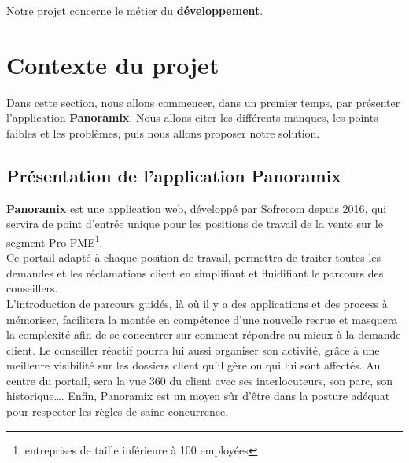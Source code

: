 Notre projet concerne le métier du \textbf{développement}.
\section[Contexte du projet]{Contexte du projet}
Dans cette section, nous allons commencer, dans un premier temps, par présenter l’application \textbf{Panoramix}. Nous allons citer les différents manques, les points faibles et les problèmes, puis nous allons proposer notre solution.
\subsection[Présentation de l’application Panoramix]{Présentation de l’application Panoramix \cite{panoramix}}
\textbf{Panoramix} est une application web, développé par Sofrecom depuis 2016, qui servira de point d'entrée unique pour les positions de travail de la vente sur le segment Pro PME\footnote{entreprises de taille inférieure à 100 employées}.\\
Ce portail adapté à chaque position de travail, permettra de traiter toutes les demandes et les réclamations client en simplifiant et fluidifiant le parcours des conseillers.\\
L’introduction de parcours guidés, là où il y a des applications et des process à mémoriser, facilitera la montée en compétence d’une nouvelle recrue et masquera la complexité afin de se concentrer sur comment répondre au mieux à la demande client. Le conseiller réactif pourra lui aussi organiser son activité, grâce à une meilleure visibilité sur les dossiers client qu’il gère ou qui lui sont affectés. Au centre du portail, sera la vue 360 du client avec ses interlocuteurs, son parc, son historique…. 
Enfin, Panoramix est un moyen sûr d’être dans la posture adéquat pour respecter les règles de saine concurrence.
